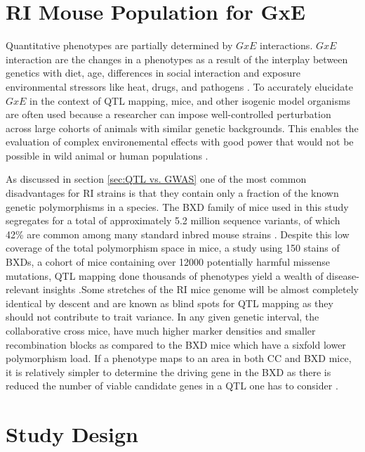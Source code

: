 \documentclass[a4paper,11pt,twoside]{book}
\begin{document}
	\section{RI Mouse Population for GxE}
	
	Quantitative phenotypes are partially determined by $GxE$ interactions. $GxE$ interaction are the changes in a phenotypes as a result of the interplay between genetics with diet, age, differences in social interaction and exposure environmental stressors like heat, drugs, and pathogens \citep{Williams2017ResourcesGenetics}. To accurately elucidate $GxE$ in the context of QTL mapping, mice, and other isogenic model organisms are often used because a researcher can impose well-controlled perturbation across large cohorts of animals with similar genetic backgrounds. This enables the evaluation of complex environemental effects  with good power that would not be possible in wild animal or human populations \citep{Williams2017ResourcesGenetics}. 
	
    As discussed in section \ref{sec:QTL vs. GWAS} one of the most common disadvantages for RI strains is that they contain only a fraction of the known genetic polymorphisms in a species. The BXD family of mice used in this study segregates for a total of approximately 5.2 million sequence variants, of which 42\% are common among many standard inbred mouse strains \citep{Williams2017ResourcesGenetics}. Despite this low coverage of the total polymorphism space in mice, a study using 150 stains of BXDs, a cohort of mice containing over 12000 potentially harmful missense mutations, QTL mapping done thousands of phenotypes yield a wealth of disease-relevant insights \citep*{Wang2016JointRisk}.Some stretches of the RI mice genome will be almost completely identical by descent \citep{Wang2016JointRisk} and are known as blind spots for QTL mapping as they should not contribute to trait variance. In any given genetic interval, the collaborative cross mice, have much higher marker densities and smaller recombination blocks as compared to the BXD mice which have a sixfold lower polymorphism load. If a phenotype maps to an area in both CC and BXD mice, it is relatively simpler to determine the driving gene in the BXD as there is reduced the number of viable candidate genes in a QTL one has to consider \citep{Williams2017ResourcesGenetics}.
	
	\section{Study Design}
	
\end{document}
